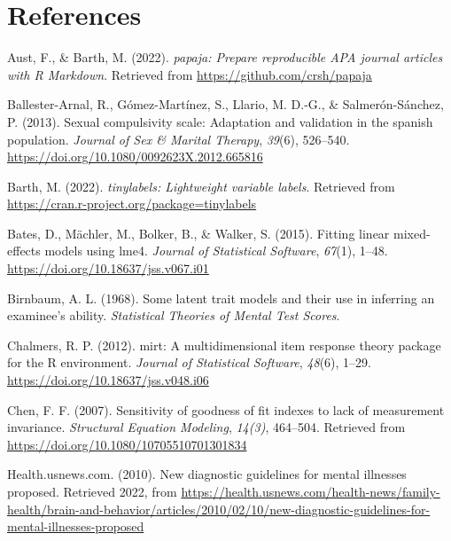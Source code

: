 \documentclass[
  man,floatsintext]{apa6}
\newlength{\cslhangindent}
\newlength{\cslentryspacingunit} %
\newenvironment{CSLReferences}[2] %
 {%
  \setlength{\parindent}{0pt}
  \ifodd #1
  \let\oldpar\par
  \def\par{\hangindent=\cslhangindent\oldpar}
  \fi
  \setlength{\parskip}{#2\cslentryspacingunit}
 }%
 {}
\begin{document}
\newpage

\hypertarget{references}{%
\section{References}\label{references}}

\hypertarget{refs}{}
\begin{CSLReferences}{1}{0}
\leavevmode{}%
Aust, F., \& Barth, M. (2022). \emph{{papaja}: {Prepare} reproducible {APA} journal articles with {R Markdown}}. Retrieved from \url{https://github.com/crsh/papaja}

\leavevmode{}%
Ballester-Arnal, R., Gómez-Martínez, S., Llario, M. D.-G., \& Salmerón-Sánchez, P. (2013). Sexual compulsivity scale: Adaptation and validation in the spanish population. \emph{Journal of Sex \& Marital Therapy}, \emph{39}(6), 526--540. \url{https://doi.org/10.1080/0092623X.2012.665816}

\leavevmode{}%
Barth, M. (2022). \emph{{tinylabels}: Lightweight variable labels}. Retrieved from \url{https://cran.r-project.org/package=tinylabels}

\leavevmode{}%
Bates, D., Mächler, M., Bolker, B., \& Walker, S. (2015). Fitting linear mixed-effects models using {lme4}. \emph{Journal of Statistical Software}, \emph{67}(1), 1--48. \url{https://doi.org/10.18637/jss.v067.i01}

\leavevmode{}%
Birnbaum, A. L. (1968). Some latent trait models and their use in inferring an examinee's ability. \emph{Statistical Theories of Mental Test Scores}.

\leavevmode{}%
Chalmers, R. P. (2012). {mirt}: A multidimensional item response theory package for the {R} environment. \emph{Journal of Statistical Software}, \emph{48}(6), 1--29. \url{https://doi.org/10.18637/jss.v048.i06}

\leavevmode{}%
Chen, F. F. (2007). Sensitivity of goodness of fit indexes to lack of measurement invariance. \emph{Structural Equation Modeling}, \emph{14(3)}, 464--504. Retrieved from \url{https://doi.org/10.1080/10705510701301834}

\leavevmode{}%
Health.usnews.com. (2010). New diagnostic guidelines for mental illnesses proposed. Retrieved 2022, from \url{https://health.usnews.com/health-news/family-health/brain-and-behavior/articles/2010/02/10/new-diagnostic-guidelines-for-mental-illnesses-proposed}


\end{CSLReferences}
\end{document}
